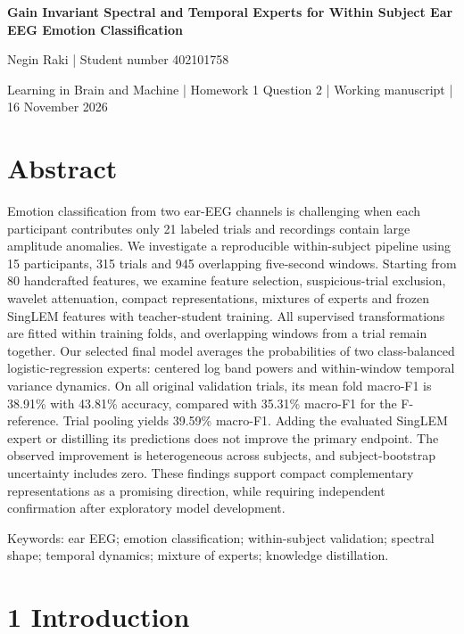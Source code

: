 \documentclass[10pt,a4paper]{article}
\begin{document}
\begin{center}

{\LARGE\bfseries Gain Invariant Spectral and Temporal Experts for Within Subject Ear EEG Emotion Classification\par}

\vspace{9pt}

{\small Negin Raki | Student number 402101758\par}

\end{center}

Learning in Brain and Machine | Homework 1 Question 2 | Working manuscript | 16 November 2026


\section*{Abstract}

Emotion classification from two ear-EEG channels is challenging when each participant contributes only 21 labeled trials and recordings contain large amplitude anomalies. We investigate a reproducible within-subject pipeline using 15 participants, 315 trials and 945 overlapping five-second windows. Starting from 80 handcrafted features, we examine feature selection, suspicious-trial exclusion, wavelet attenuation, compact representations, mixtures of experts and frozen SingLEM features with teacher-student training. All supervised transformations are fitted within training folds, and overlapping windows from a trial remain together. Our selected final model averages the probabilities of two class-balanced logistic-regression experts: centered log band powers and within-window temporal variance dynamics. On all original validation trials, its mean fold macro-F1 is 38.91\% with 43.81\% accuracy, compared with 35.31\% macro-F1 for the F- reference. Trial pooling yields 39.59\% macro-F1. Adding the evaluated SingLEM expert or distilling its predictions does not improve the primary endpoint. The observed improvement is heterogeneous across subjects, and subject-bootstrap uncertainty includes zero. These findings support compact complementary representations as a promising direction, while requiring independent confirmation after exploratory model development.


Keywords: ear EEG; emotion classification; within-subject validation; spectral shape; temporal dynamics; mixture of experts; knowledge distillation.


\section*{1 Introduction}
\end{document}
